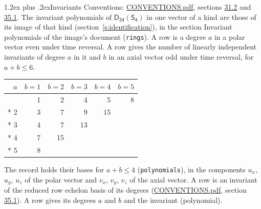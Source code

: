 \documentclass[10pt,a4paper]{article}
\makeatletter
\renewcommand\section{\@startsection{section}{1}{\z@}{-3ex plus -1ex minus -.2ex}%
  {1.2ex plus .2ex}{\normalfont\large\sffamily\bfseries\color{parttitle}}}
\numberwithin{equation}{section}
\newcommand{\grp}[1]{\mathsf{#1}}
\makeatother
\begin{document}
\section{Invariants}\label{s:invariants}
Conventions: \href{../../CONVENTIONS.pdf}{CONVENTIONS.pdf}, sections \href{../../CONVENTIONS.pdf\#conv.31.2}{31.2} and \href{../../CONVENTIONS.pdf\#conv.35.1}{35.1}.
The invariant polynomials of $\grp{D_{2d}}(\grp{S_{4}})$ in one vector of a kind are those of its image of that kind (section~\ref{s:identification}), in the section Invariant polynomials of the image's document (\texttt{rings}).
\leavevmode\label{n:index.degree.polar}\label{n:index.degree.axial}A row is a degree $a$ in a polar vector even under time reversal. A row gives the number of linearly independent invariants of degree $a$ in it and $b$ in an axial vector odd under time reversal, for $a + b \le 6$.
{\small\begin{longtable}{@{}rrrrrr@{}}\toprule
$a$ & $b = 1$ & $b = 2$ & $b = 3$ & $b = 4$ & $b = 5$\\\midrule\endhead
\bottomrule\endfoot\endlastfoot
1 & 1 & 2 & 4 & 5 & 8\\*
2 & 3 & 7 & 9 & 15 & \\*
3 & 4 & 7 & 13 &  & \\*
4 & 7 & 15 &  &  & \\*
5 & 8 &  &  &  & \\
\bottomrule\end{longtable}}
\leavevmode\label{n:local.component.polar}\label{n:local.component.axial}The record holds their bases for $a + b \le 4$ (\texttt{polynomials}), in the components $u_{x}$, $u_{y}$, $u_{z}$ of the polar vector and $v_{x}$, $v_{y}$, $v_{z}$ of the axial vector. \label{n:head.polynomial}A row is an invariant of the reduced row echelon basis of its degrees (\href{../../CONVENTIONS.pdf}{CONVENTIONS.pdf}, section \href{../../CONVENTIONS.pdf\#conv.35.1}{35.1}). A row gives its degrees $a$ and $b$ and the invariant (polynomial).
\end{document}
